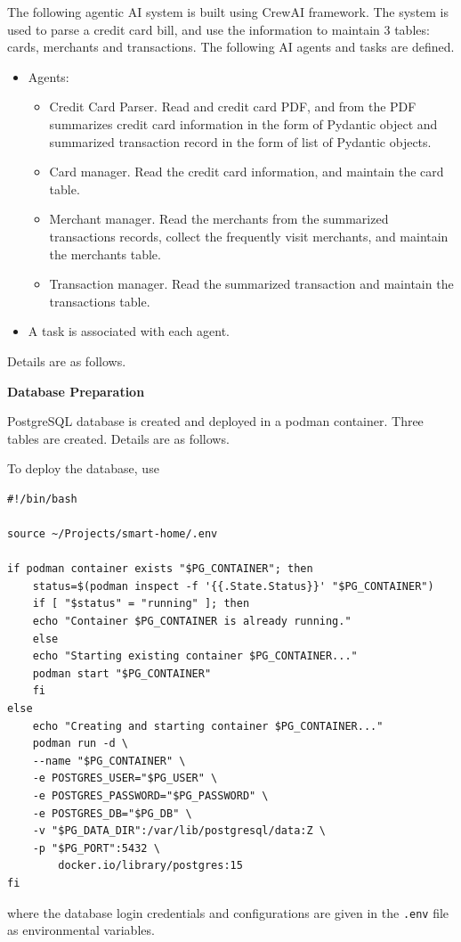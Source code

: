 The following agentic AI system is built using CrewAI framework. The system is used to parse a credit card bill, and use the information to maintain 3 tables: cards, merchants and transactions. The following AI agents and tasks are defined.
\begin{itemize}
  \item Agents:
  \begin{itemize}
    \item Credit Card Parser. Read and credit card PDF, and from the PDF summarizes credit card information in the form of Pydantic object and summarized transaction record in the form of list of Pydantic objects. 
    \item Card manager. Read the credit card information, and maintain the card table.
    \item Merchant manager. Read the merchants from the summarized transactions records, collect the frequently visit merchants, and maintain the merchants table.
    \item Transaction manager. Read the summarized transaction and maintain the transactions table.
  \end{itemize}
  \item A task is associated with each agent.
\end{itemize}

Details are as follows.

\vspace{0.1in}
\noindent \textbf{Database Preparation}
\vspace{0.1in}

PostgreSQL database is created and deployed in a podman container. Three tables are created. Details are as follows.

To deploy the database, use
\begin{lstlisting}
#!/bin/bash

source ~/Projects/smart-home/.env

if podman container exists "$PG_CONTAINER"; then
    status=$(podman inspect -f '{{.State.Status}}' "$PG_CONTAINER")
    if [ "$status" = "running" ]; then
	echo "Container $PG_CONTAINER is already running."
    else
	echo "Starting existing container $PG_CONTAINER..."
	podman start "$PG_CONTAINER"
    fi
else
    echo "Creating and starting container $PG_CONTAINER..."
    podman run -d \
	--name "$PG_CONTAINER" \
	-e POSTGRES_USER="$PG_USER" \
	-e POSTGRES_PASSWORD="$PG_PASSWORD" \
	-e POSTGRES_DB="$PG_DB" \
	-v "$PG_DATA_DIR":/var/lib/postgresql/data:Z \
	-p "$PG_PORT":5432 \
        docker.io/library/postgres:15
fi
\end{lstlisting}
where the database login credentials and configurations are given in the \verb|.env| file as environmental variables.

